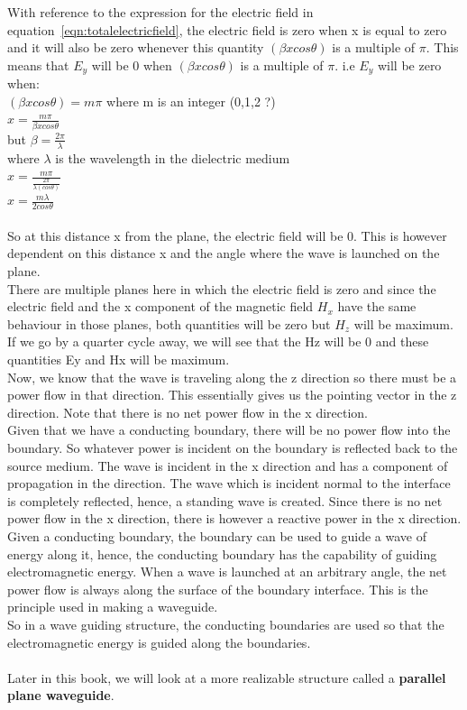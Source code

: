 With reference to the expression for the electric field in equation~\ref{eqn:totalelectricfield}, the electric field is zero when x is equal to zero and it will also be zero whenever this quantity $(\beta xcos\theta)$ is a multiple of $\pi$. This means that $E_y$ will be 0 when $(\beta xcos\theta)$ is a multiple of $\pi$. i.e $E_y$ will be zero when:\\ 
$(\beta xcos\theta) = m\pi$     where m is an integer (0,1,2 ?)\\ 
$ x = \frac{m\pi}{\beta xcos\theta}$   \\ 
but $\beta = \frac{2\pi}{\lambda}$ \\
where $\lambda$ is the wavelength in the dielectric medium\\ 
$x =\frac{m\pi}{ \frac{2\pi}{\lambda (cos\theta)}} $\\ 
$x = \frac{m\lambda}{2cos\theta}$ \\\\ 
So at this distance x from the plane, the electric field will be 0. This is however dependent on this distance x and the angle where the wave is launched on the plane.\\ 
There are multiple planes here in which the electric field is zero and since the electric field and the x component of the magnetic field
$H_x$ have the same behaviour in those planes, both quantities will be zero but $H_z$ will be maximum. If we go by a quarter cycle away, we will see that the Hz will be 0 and these quantities Ey and Hx will be maximum.\\ 
Now, we know that the wave is traveling along the z direction so there must be a power flow in that direction. This essentially gives us the pointing vector in the z direction. Note that there is no net power flow in the x direction.\\ 
Given that we have a conducting boundary, there will be no power flow into the boundary. So whatever power is incident on the boundary is reflected back to the source medium. The wave is incident in the x direction and has a component of propagation in the direction. The wave which is incident normal to the interface is completely reflected, hence, a standing wave is created. Since there is no net power flow in the x direction, there is however a reactive power in the x direction. Given a conducting boundary, the boundary can be used to guide a wave of energy along it, hence, the conducting boundary has the capability of guiding electromagnetic energy. When a wave is launched at an arbitrary angle, the net power flow is always along the surface of the boundary interface. This is the principle used in making a waveguide. \\ 
So in a wave guiding structure, the conducting boundaries are used so that the electromagnetic energy is guided along the
boundaries.\\\\ 
Later in this book, we will look at a more realizable structure called a \textbf{parallel plane waveguide}.